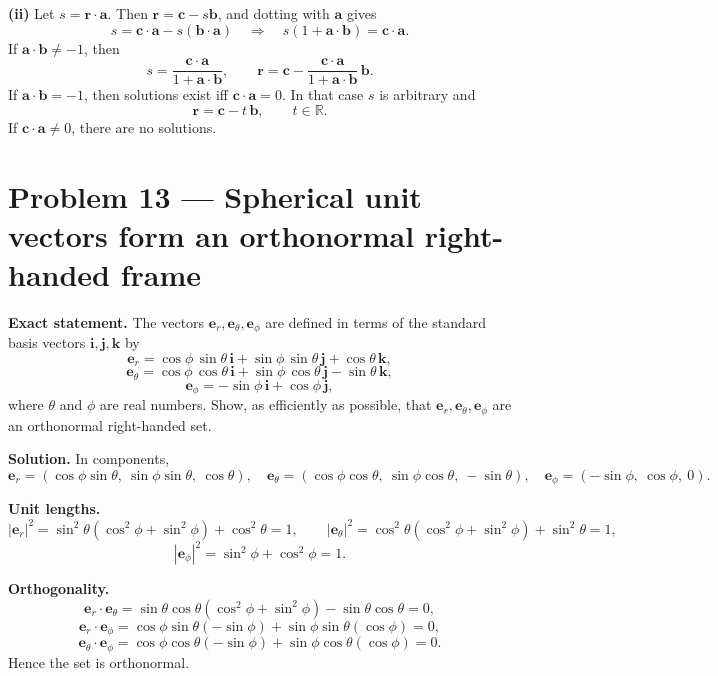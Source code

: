 \documentclass[12pt,a4paper]{article}
\theoremstyle{plain}
\theoremstyle{definition}      %
\begin{document}
\medskip
\noindent\textbf{(ii)} Let \(s=\mathbf r\cdot\mathbf a\). Then \(\mathbf r=\mathbf c-s\mathbf b\), and dotting with \(\mathbf a\) gives
\[
s=\mathbf c\cdot\mathbf a-s(\mathbf b\cdot\mathbf a)
\quad\Longrightarrow\quad
s(1+\mathbf a\cdot\mathbf b)=\mathbf c\cdot\mathbf a.
\]
If \(\mathbf a\cdot\mathbf b\ne -1\), then
\[
s=\frac{\mathbf c\cdot\mathbf a}{1+\mathbf a\cdot\mathbf b},
\qquad
\mathbf r=\mathbf c-\frac{\mathbf c\cdot\mathbf a}{1+\mathbf a\cdot\mathbf b}\,\mathbf b.
\]
If \(\mathbf a\cdot\mathbf b=-1\), then solutions exist iff \(\mathbf c\cdot\mathbf a=0\). In that case \(s\) is arbitrary and
\[
\mathbf r=\mathbf c-t\,\mathbf b,\qquad t\in\mathbb R.
\]
If \(\mathbf c\cdot\mathbf a\ne 0\), there are no solutions.

\section*{Problem 13 — Spherical unit vectors form an orthonormal right-handed frame}

\textbf{Exact statement.}
The vectors \(\mathbf e_r,\mathbf e_\theta,\mathbf e_\phi\) are defined in terms of the standard basis vectors
\(\mathbf i,\mathbf j,\mathbf k\) by
\[
\mathbf e_r=\cos\phi\,\sin\theta\,\mathbf i+\sin\phi\,\sin\theta\,\mathbf j+\cos\theta\,\mathbf k,
\]
\[
\mathbf e_\theta=\cos\phi\,\cos\theta\,\mathbf i+\sin\phi\,\cos\theta\,\mathbf j-\sin\theta\,\mathbf k,
\]
\[
\mathbf e_\phi=-\sin\phi\,\mathbf i+\cos\phi\,\mathbf j,
\]
where \(\theta\) and \(\phi\) are real numbers. Show, as efficiently as possible, that
\(\mathbf e_r,\mathbf e_\theta,\mathbf e_\phi\) are an orthonormal right-handed set.

\textbf{Solution.}
In components,
\[
\mathbf e_r=(\cos\phi\sin\theta,\ \sin\phi\sin\theta,\ \cos\theta),\quad
\mathbf e_\theta=(\cos\phi\cos\theta,\ \sin\phi\cos\theta,\ -\sin\theta),\quad
\mathbf e_\phi=(-\sin\phi,\ \cos\phi,\ 0).
\]

\medskip
\noindent\textbf{Unit lengths.}
\[
|\mathbf e_r|^2=\sin^2\theta(\cos^2\phi+\sin^2\phi)+\cos^2\theta=1,\qquad
|\mathbf e_\theta|^2=\cos^2\theta(\cos^2\phi+\sin^2\phi)+\sin^2\theta=1,
\]
\[
|\mathbf e_\phi|^2=\sin^2\phi+\cos^2\phi=1.
\]

\medskip
\noindent\textbf{Orthogonality.}
\[
\mathbf e_r\cdot\mathbf e_\theta
=\sin\theta\cos\theta(\cos^2\phi+\sin^2\phi)-\sin\theta\cos\theta=0,
\]
\[
\mathbf e_r\cdot\mathbf e_\phi
=\cos\phi\sin\theta(-\sin\phi)+\sin\phi\sin\theta(\cos\phi)=0,
\]
\[
\mathbf e_\theta\cdot\mathbf e_\phi
=\cos\phi\cos\theta(-\sin\phi)+\sin\phi\cos\theta(\cos\phi)=0.
\]
Hence the set is orthonormal.
\end{document}
